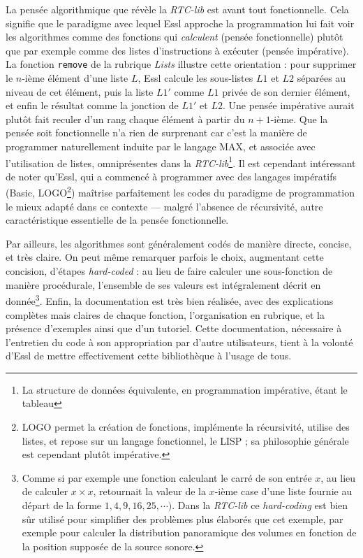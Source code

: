 \documentclass[a4paper,12pt]{article}
\begin{document}
La pensée algorithmique que révèle la \emph{RTC-lib} est avant tout fonctionnelle. Cela signifie que le paradigme avec lequel Essl approche la programmation lui fait voir les algorithmes comme des fonctions qui \emph{calculent} (pensée fonctionnelle) plutôt que par exemple comme des listes d'instructions à exécuter (pensée impérative). La fonction \texttt{remove} de la rubrique \emph{Lists} illustre cette orientation : pour supprimer le $n$-ième élément d'une liste $L$, Essl calcule les sous-listes $L1$ et $L2$ séparées au niveau de cet élément, puis la liste $L1'$ comme $L1$ privée de son dernier élément, et enfin le résultat comme la jonction de $L1'$ et $L2$. Une pensée impérative aurait plutôt fait reculer d'un rang chaque élément à partir du $n+1$-ième. Que la pensée soit fonctionnelle n'a rien de surprenant car c'est la manière de programmer naturellement induite par le langage MAX, et associée avec l'utilisation de listes, omniprésentes dans la \emph{RTC-lib}\footnote{La structure de données équivalente, en programmation impérative, étant le tableau}. Il est cependant intéressant de noter qu'Essl, qui a commencé à programmer avec des langages impératifs (Basic, LOGO\footnote{LOGO permet la création de fonctions, implémente la récursivité, utilise des listes, et repose sur un langage fonctionnel, le LISP ; sa philosophie générale est cependant plutôt impérative.}) maîtrise parfaitement les codes du paradigme de programmation le mieux adapté dans ce contexte --- malgré l'absence de récursivité, autre caractéristique essentielle de la pensée fonctionnelle.

Par ailleurs, les algorithmes sont généralement codés de manière directe, concise, et très claire. On peut même remarquer parfois le choix, augmentant cette concision, d'étapes \emph{hard-coded} : au lieu de faire calculer une sous-fonction de manière procédurale, l'ensemble de ses valeurs est intégralement décrit en donnée\footnote{Comme si par exemple une fonction calculant le carré de son entrée $x$, au lieu de calculer $x\times x$, retournait la valeur de la $x$-ième case d'une liste fournie au départ de la forme $1,4,9,16,25,\cdots)$. Dans la \emph{RTC-lib} ce \emph{hard-coding} est bien sûr utilisé pour simplifier des problèmes plus élaborés que cet exemple, par exemple pour calculer la distribution panoramique des volumes en fonction de la position supposée de la source sonore.}. Enfin, la documentation est très bien réalisée, avec des explications complètes mais claires de chaque fonction, l'organisation en rubrique, et la présence d'exemples ainsi que d'un tutoriel. Cette documentation, nécessaire à l'entretien du code à son appropriation par d'autre utilisateurs, tient à la volonté d'Essl de mettre effectivement cette bibliothèque à l'usage de tous.
\end{document}
